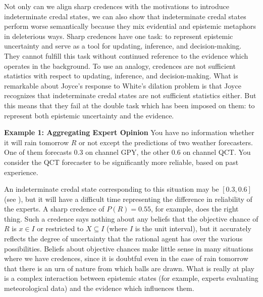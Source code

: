 Not only can we align sharp credences with the motivations to introduce indeterminate credal states, we can also show that indeterminate credal states perform worse semantically because they mix evidential and epistemic metaphors in deleterious ways. Sharp credences have one task: to represent epistemic uncertainty and serve as a tool for updating, inference, and decision-making. They cannot fulfill this task without continued reference to the evidence which operates in the background. To use an analogy, credences are not sufficient statistics with respect to updating, inference, and decision-making. What is remarkable about Joyce's response to White's dilation problem is that Joyce recognizes that indeterminate credal states are not sufficient statistics either. But this means that they fail at the double task which has been imposed on them: to represent both epistemic uncertainty and the evidence.

\begin{quotex}
  \textbf{Example 1: Aggregating Expert Opinion} You have no information whether it will rain tomorrow $R$ or not except the predictions of two weather forecasters. One of them forecasts 0.3 on channel GPY, the other 0.6 on channel QCT. You consider the QCT forecaster to be significantly more reliable, based on past experience.
\end{quotex}

An indeterminate credal state corresponding to this situation may be $[0.3,0.6]$ (see ), but it will have a difficult time representing the difference in reliability of the experts. A sharp credence of $P(R)=0.55$, for example, does the right thing. Such a credence says nothing about any beliefs that the objective chance of $R$ is $x\in{}I$ or restricted to $X\subseteq{}I$ (where $I$ is the unit interval), but it accurately reflects the degree of uncertainty that the rational agent has over the various possibilities. Beliefs about objective chances make little sense in many situations where we have credences, since it is doubtful even in the case of rain tomorrow that there is an urn of nature from which balls are drawn. What is really at play is a complex interaction between epistemic states (for example, experts evaluating meteorological data) and the evidence which influences them.

